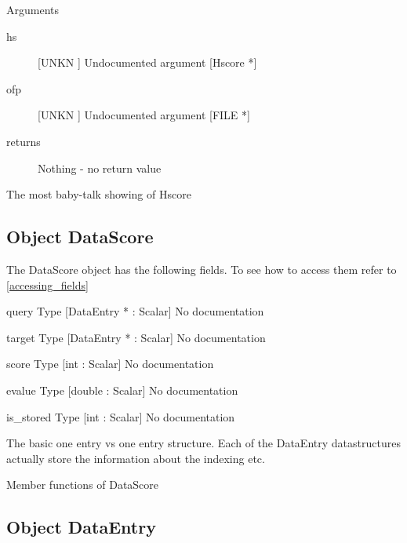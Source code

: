 Arguments
\begin{description}
\item[hs] [UNKN ] Undocumented argument [Hscore *]
\item[ofp] [UNKN ] Undocumented argument [FILE *]
\item[returns] Nothing - no return value
\end{description}
The most baby-talk showing of Hscore


\subsection{Object DataScore}

\label{object_DataScore}

The DataScore object has the following fields. To see how to access them refer to \ref{accessing_fields}
\begin{description}
\item{query} Type [DataEntry * : Scalar] No documentation

\item{target} Type [DataEntry * : Scalar] No documentation

\item{score} Type [int : Scalar] No documentation

\item{evalue} Type [double : Scalar] No documentation

\item{is_stored} Type [int : Scalar] No documentation

\end{description}
The basic one entry vs one entry structure. Each
of the DataEntry datastructures actually store the 
information about the indexing etc.




Member functions of DataScore

\subsection{Object DataEntry}

